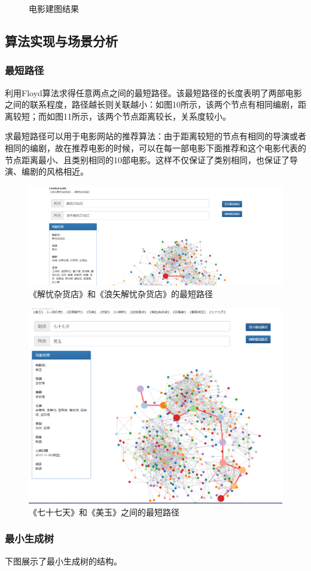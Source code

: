 \documentclass[UTF8, onecolumn, a4paper]{article}
\begin{document}
\begin{center}
\begin{figure}[ht]
\begin{minipage}[b]{0.95\linewidth}
\begin{minipage}[b]{0.46\linewidth}
    	\caption{电影建图结果}
    	\end{minipage}
    \end{minipage}
    \end{figure}
\end{center}
\subsection{算法实现与场景分析}
\subsubsection{最短路径}
    利用Floyd算法求得任意两点之间的最短路径。该最短路径的长度表明了两部电影之间的联系程度，路径越长则关联越小：如图10所示，该两个节点有相同编剧，距离较短；而如图11所示，该两个节点距离较长，关系度较小。
    
    求最短路径可以用于电影网站的推荐算法：由于距离较短的节点有相同的导演或者相同的编剧，故在推荐电影的时候，可以在每一部电影下面推荐和这个电影代表的节点距离最小、且类别相同的10部电影。这样不仅保证了类别相同，也保证了导演、编剧的风格相近。
\begin{figure}[H]
	\centering
	\includegraphics[width=0.6\linewidth]{../pictures/show8}
	\caption{《解忧杂货店》和《浪矢解忧杂货店》的最短路径}
\end{figure}
\begin{figure}[H]
	\centering
	\includegraphics[width=0.6\linewidth]{../pictures/show9}
	\caption{《七十七天》和《美玉》之间的最短路径}
\end{figure}
\subsubsection{最小生成树}
	下图展示了最小生成树的结构。
	
\end{document}
